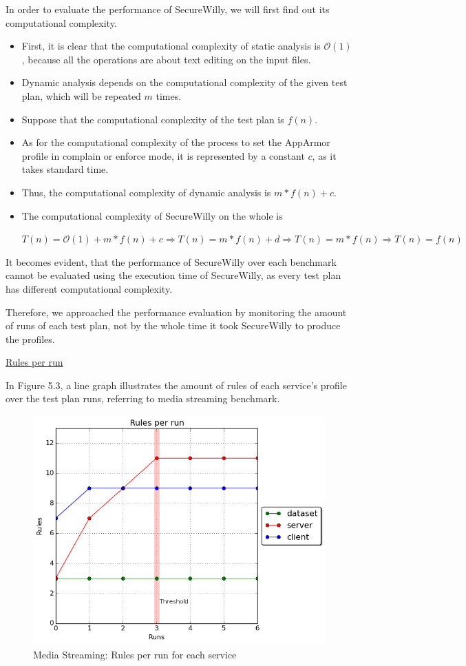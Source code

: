 In order to evaluate the performance of SecureWilly, we will first find out its computational complexity.

\begin{itemize}
\item First, it is clear that the computational complexity of static analysis is $\mathcal{O}(1)$, because all the operations are about text editing on the input files.
\item Dynamic analysis depends on the computational complexity of the given test plan, which will be repeated $m$ times.

\item Suppose that the computational complexity of the test plan is $f(n)$.

\item As for the computational complexity of the process to set the AppArmor profile in complain or enforce mode, it is represented by a constant $c$, as it takes standard time.

\item Thus, the computational complexity of dynamic analysis is $m*f(n) + c$.

\item The computational complexity of SecureWilly on the whole is

$T(n) = \mathcal{O}(1) + m*f(n) + c \Rightarrow T(n) = m*f(n) + d \Rightarrow T(n) = m*f(n) \Rightarrow T(n) = f(n)$

\end{itemize}

It becomes evident, that the performance of SecureWilly over each benchmark cannot be evaluated using the execution time of SecureWilly, as every test plan has different computational complexity.

Therefore, we approached the performance evaluation by monitoring the amount of runs of each test plan, not by the whole time it took SecureWilly to produce the profiles.

\hfill\break
\underline{Rules per run}
\hfill\break

In Figure 5.3, a line graph illustrates the amount of rules of each service's profile over the test plan runs, referring to media streaming benchmark.

\begin{figure}[h!]
  \centering
   \includegraphics[width=0.70\linewidth]{figures/mediastreaming/rulesthreshold.png}
   \caption{Media Streaming: Rules per run for each service}
\end{figure}

